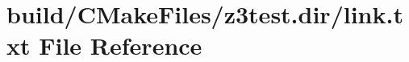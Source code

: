 \hypertarget{z3test_8dir_2link_8txt}{}\section{build/\+C\+Make\+Files/z3test.dir/link.txt File Reference}
\label{z3test_8dir_2link_8txt}
